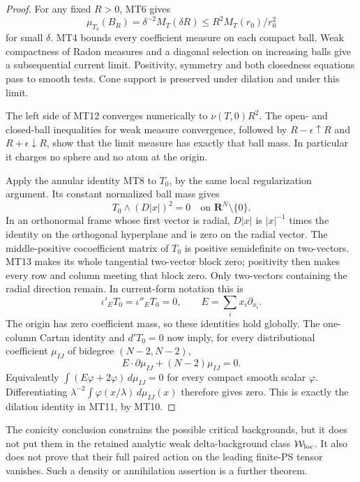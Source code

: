\begin{proof}
For any fixed \(R>0\), MT6 gives
\[
 \mu_{T_\delta}(B_R)
       =\delta^{-2}M_T(\delta R)
       \le R^2 M_T(r_0)/r_0^2
\tag{MT12}
\]
for small \(\delta\).  MT4 bounds every coefficient
measure on each compact ball.  Weak compactness of
Radon measures and a diagonal selection on increasing
balls give a subsequential current limit.  Positivity,
symmetry and both closedness equations pass to smooth
tests.  Cone support is preserved under dilation and
under this limit.

The left side of MT12 converges numerically to
\(\nu(T,0)R^2\).  The open- and closed-ball
inequalities for weak measure convergence, followed
by \(R-\epsilon\uparrow R\) and
\(R+\epsilon\downarrow R\), show that the limit
measure has exactly that ball mass.  In particular
it charges no sphere and no atom at the origin.

Apply the annular identity MT8 to \(T_0\), by the
same local regularization argument.  Its constant
normalized ball mass gives
\[
                T_0\wedge(D|x|)^2=0
                                 \quad\text{on }\mathbf R^N\setminus\{0\}.
\tag{MT13}
\]
In an orthonormal frame whose first vector is radial,
\(D|x|\) is \(|x|^{-1}\) times the identity on the
orthogonal hyperplane and is zero on the radial vector.
The middle-positive cocoefficient matrix of \(T_0\)
is positive semidefinite on two-vectors.  MT13 makes
its whole tangential two-vector block zero; positivity
then makes every row and column meeting that block
zero.  Only two-vectors containing the radial direction
remain.  In current-form notation this is
\[
                    \iota'_E T_0=\iota''_E T_0=0,
                      \qquad E=\sum_i x_i\partial_{x_i}.
\tag{MT14}
\]
The origin has zero coefficient mass, so these identities
hold globally.  The one-column Cartan identity and
\(d'T_0=0\) now imply, for every distributional
coefficient \(\mu_{IJ}\) of bidegree \((N-2,N-2)\),
\[
             E\cdot\partial\mu_{IJ}+(N-2)\mu_{IJ}=0.
\tag{MT15}
\]
Equivalently
\(\int(E\varphi+2\varphi)\,d\mu_{IJ}=0\)
for every compact smooth scalar \(\varphi\).
Differentiating
\(\lambda^{-2}\int\varphi(x/\lambda)\,d\mu_{IJ}(x)\)
therefore gives zero.  This is exactly the dilation
identity in MT11, by MT10.
\end{proof}

The conicity conclusion constrains the possible critical
backgrounds, but it does not put them in the retained
analytic weak delta-background class \(\mathcal W_{\rm loc}\).
It also does not prove that their full paired action on
the leading finite-PS tensor vanishes.  Such a density
or annihilation assertion is a further theorem.


